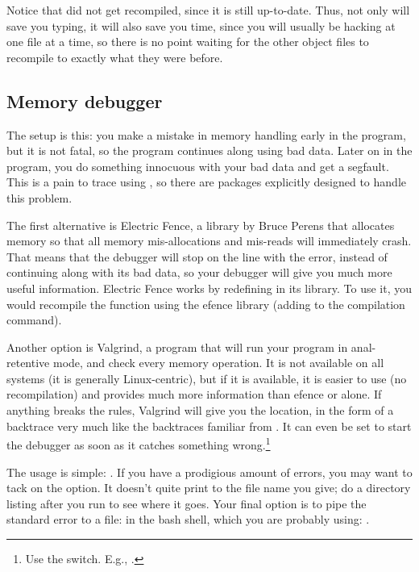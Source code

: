 \documentclass[12pt]{article}
\makeatletter
\def\ind#1{\index{#1}#1}
\def\ttind#1{\index{#1@\cinline{#1}}\cinline{#1}}
\makeatother
\begin{document}
Notice that  did not get recompiled, since it is still
up-to-date. Thus, not only will  save you typing, it will also
save you time, since you will usually be hacking at one file at a time,
so there is no point waiting for the other object files to recompile
to exactly what they were before. 

\subsection{Memory debugger}  

The setup is this: you make a mistake in memory handling early in the
program, but it is not fatal, so the program continues along using bad
data. Later on in the program, you do something innocuous with your bad
data and get a segfault. This is a pain to trace using , so
there are packages explicitly designed to handle this problem.

The first alternative is \ind{Electric Fence}, a
library by Bruce Perens that allocates memory so that all memory
mis-allocations and mis-reads will immediately crash.  That means that
the debugger will stop on the line with the error, instead of continuing
along with its bad data, so your debugger will give you much more useful
information.  Electric Fence works by redefining \ttind{malloc} in 
its library. To use it, you would recompile the function
using the efence library (adding  to the compilation
command).


Another option is \ind{Valgrind}, a program that will
run your program in anal-retentive mode, and check every memory operation. 
It is not available on all systems (it is generally Linux-centric), but
if it is available, it is easier to use (no recompilation) and provides much more information than efence or
 alone. If anything breaks the rules, Valgrind will give you
the location, in the form of a backtrace very much like the backtraces
familiar from . It can even be set to start the debugger as soon
as it catches something wrong.\footnote{Use the  switch.
E.g., .}

The usage is simple: . If you have a prodigious amount
of errors, you may want to tack on the  option. It doesn't
quite print to the file name you give; do a directory listing after you run  to see where it goes.  Your final option is to pipe the standard
error to a file: in the bash shell, which you are probably using: .
\end{document}
